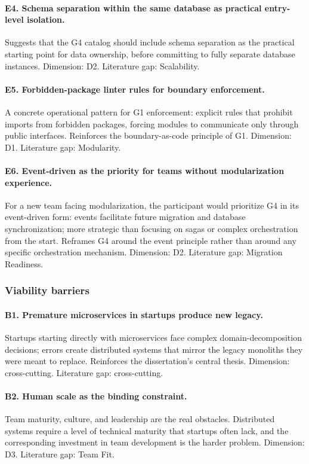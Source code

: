 \paragraph*{E4. Schema separation within the same database as practical entry-level isolation.} Suggests that the G4 catalog should include schema separation as the practical starting point for data ownership, before committing to fully separate database instances. Dimension: D2. Literature gap: Scalability.

\paragraph*{E5. Forbidden-package linter rules for boundary enforcement.} A concrete operational pattern for G1 enforcement: explicit rules that prohibit imports from forbidden packages, forcing modules to communicate only through public interfaces. Reinforces the boundary-as-code principle of G1. Dimension: D1. Literature gap: Modularity.

\paragraph*{E6. Event-driven as the priority for teams without modularization experience.} For a new team facing modularization, the participant would prioritize G4 in its event-driven form: events facilitate future migration and database synchronization; more strategic than focusing on sagas or complex orchestration from the start. Reframes G4 around the event principle rather than around any specific orchestration mechanism. Dimension: D2. Literature gap: Migration Readiness.

\subsubsection*{Viability barriers}

\paragraph*{B1. Premature microservices in startups produce new legacy.} Startups starting directly with microservices face complex domain-decomposition decisions; errors create distributed systems that mirror the legacy monoliths they were meant to replace. Reinforces the dissertation's central thesis. Dimension: cross-cutting. Literature gap: cross-cutting.

\paragraph*{B2. Human scale as the binding constraint.} Team maturity, culture, and leadership are the real obstacles. Distributed systems require a level of technical maturity that startups often lack, and the corresponding investment in team development is the harder problem. Dimension: D3. Literature gap: Team Fit.

